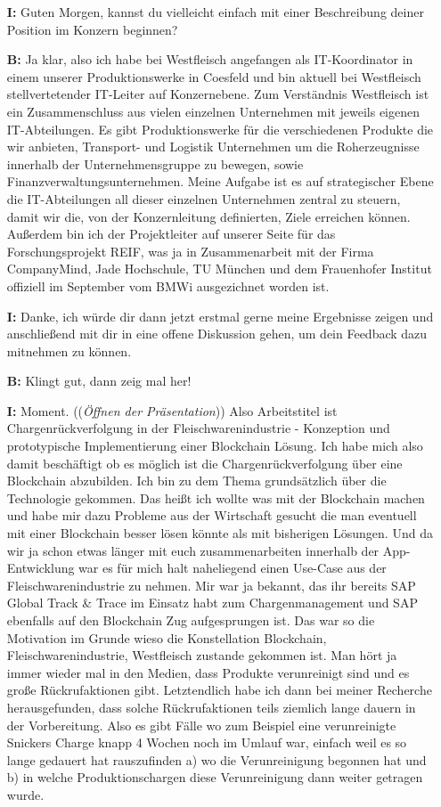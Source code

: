 \begin{itemize}
  \setlength\itemsep{0em}
  \linenumbers
  \item[\textbf{I:}] Guten Morgen, kannst du vielleicht einfach mit einer Beschreibung deiner Position im Konzern beginnen?
  \item[\textbf{B:}] Ja klar, also ich habe bei Westfleisch angefangen als IT-Koordinator in einem unserer Produktionswerke in Coesfeld und bin aktuell bei Westfleisch stellvertetender IT-Leiter auf Konzernebene. Zum Verständnis Westfleisch ist ein Zusammenschluss aus vielen einzelnen Unternehmen mit jeweils eigenen IT-Abtei\-lungen. Es gibt Produktionswerke für die verschiedenen Produkte die wir anbieten, Transport- und Logistik Unternehmen um die Roherzeugnisse innerhalb der Unternehmensgruppe zu bewegen, sowie Finanzverwaltungsunternehmen. Meine Aufgabe ist es auf strategischer Ebene die IT-Abteilungen all dieser einzelnen Unternehmen zentral zu steuern, damit wir die, von der Konzernleitung definierten, Ziele erreichen können. Außerdem bin ich der Projektleiter auf unserer Seite für das Forschungsprojekt REIF, was ja in Zusammenarbeit mit der Firma CompanyMind, Jade Hochschule, TU München und dem Frauenhofer Institut offiziell im September vom BMWi ausgezichnet worden ist.
  \item[\textbf{I:}] Danke, ich würde dir dann jetzt erstmal gerne meine Ergebnisse zeigen und anschließend mit dir in eine offene Diskussion gehen, um dein Feedback dazu mitnehmen zu können.
  \item[\textbf{B:}] Klingt gut, dann zeig mal her!
  \item[\textbf{I:}] Moment. ((\textit{Öffnen der Präsentation})) Also Arbeitstitel ist \glqq Chargenrückverfolgung in der Fleischwarenindustrie - Konzeption und prototypische Implementierung einer Blockchain Lösung\grqq{}. Ich habe mich also damit beschäftigt ob es möglich ist die Chargenrückverfolgung über eine Blockchain abzubilden. Ich bin zu dem Thema grundsätzlich über die Technologie gekommen. Das heißt ich wollte was mit der Blockchain machen und habe mir dazu Probleme aus der Wirtschaft gesucht die man eventuell mit einer Blockchain besser lösen könnte als mit bisherigen Lösungen. Und da wir ja schon etwas länger mit euch zusammenarbeiten innerhalb der App-Entwicklung war es für mich halt naheliegend einen Use-Case aus der Fleischwarenindustrie zu nehmen. Mir war ja bekannt, das ihr bereits SAP Global Track \& Trace im Einsatz habt zum Chargenmanagement und SAP ebenfalls auf den Blockchain Zug aufgesprungen ist. Das war so die Motivation im Grunde wieso die Konstellation Blockchain, Fleischwarenindustrie, Westfleisch zustande gekommen ist. Man hört ja immer wieder mal in den Medien, dass Produkte verunreinigt sind und es große Rückrufaktionen gibt. Letztendlich habe ich dann bei meiner Recherche herausgefunden, dass solche Rückrufaktionen teils ziemlich lange dauern in der Vorbereitung. Also es gibt Fälle wo zum Beispiel eine verunreinigte Snickers Charge knapp 4 Wochen noch im Umlauf war, einfach weil es so lange gedauert hat rauszufinden a) wo die Verunreinigung begonnen hat und b) in welche Produktionschargen diese Verunreinigung dann weiter getragen wurde.

\end{itemize}
